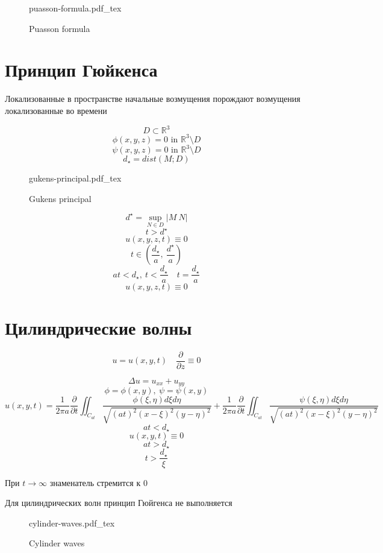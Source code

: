 \documentclass[a4paper]{article}
\newcommand{\incfig}[1]{%
\def\svgwidth{\columnwidth}
{#1.pdf_tex}
}
\begin{document}
\begin{figure}[!ht]
    \centering
    \incfig{puasson-formula}
    \caption{Puasson formula}
    \label{fig:puasson-formula}
\end{figure}

\section*{Принцип Гюйкенса}

Локализованные в пространстве начальные возмущения порождают возмущения локализованные
во времени

\[
    D \subset \mathbb{R}^3
\]
\[
    \phi(x,y,z) = 0 \text{ in } \mathbb{R}^3 \setminus D
\]
\[
    \psi(x,y,z) = 0 \text{ in } \mathbb{R}^3 \setminus D
\]
\[
    d_{\star} = dist(M;D)
\]

\begin{figure}[!ht]
    \centering
    \incfig{gukens-principal}
    \caption{Gukens principal}
    \label{fig:gukens-principal}
\end{figure}

\[
    d^{\star} = \sup_{N \in D} |M \ N|
\]
\[
    t > d^{\star}
\]
\[
    u(x,y,z,t) \equiv 0
\]
\[
    t \in \left( \frac{d_{\star}}{a}, \ \frac{d^{\star}}{a} \right)
\]
\[
    at < d_{\star}, \ t < \frac{d_{\star}}{a} \quad t = \frac{d_{\star}}{a} 
\]
\[
    u(x,y,z,t) \equiv 0
\]

\section*{\centering Цилиндрические волны}

\[
    u = u(x,y,t) \quad \frac{\partial}{\partial z} \equiv 0 
\]

\[
    \Delta u = u_{xx} + u_{y y}
\]
\[
    \phi = \phi(x,y), \ \psi = \psi(x,y)
\]
\[
    u(x,y,t) = \frac{1}{2 \pi a} \frac{\partial}{\partial t} \iint_{C_{at}}
    \frac{\phi(\xi, \eta) d\xi d\eta}{\sqrt{(at)^2 (x - \xi)^2 (y - \eta)^2} } 
    +
    \frac{1}{2 \pi a} \frac{\partial}{\partial t} \iint_{C_{at}}
    \frac{\psi(\xi, \eta) d\xi d\eta}{\sqrt{(at)^2 (x - \xi)^2 (y - \eta)^2} }
\]
\[
    at < d_{\star}
\]
\[
    u(x,y,t) \equiv 0
\]
\[
    at > d_{\star}
\]
\[
    t > \frac{d_{\star}}{\xi} 
\]

При $ t \to \infty $ знаменатель стремится к 0

Для цилиндрических волн принцип Гюйгенса не выполняется

\begin{figure}[!ht]
    \centering
    \incfig{cylinder-waves}
    \caption{Cylinder waves}
    \label{fig:cylinder-waves}
\end{figure}
\end{document}
